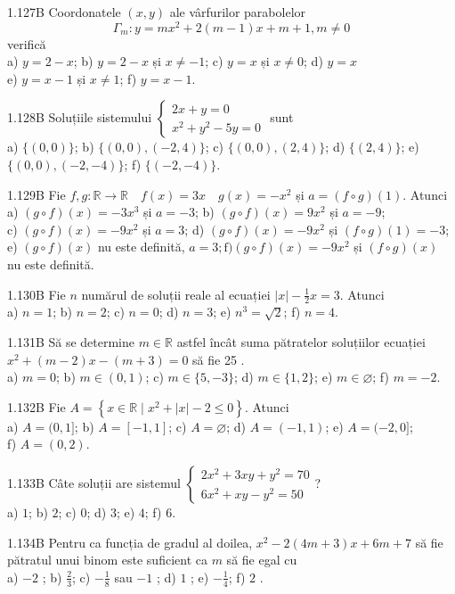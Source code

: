 \documentclass[11pt]{article}
\begin{document}
1.127B Coordonatele $(x, y)$ ale vârfurilor parabolelor $$\Gamma_{m}: y=m x^{2}+2(m-1) x+m+1, m\neq 0$$ verifică\\ a) $y=2-x$; b) $y=2-x$ și $x \neq-1$; c) $y=x$ și $x \neq 0$; d) $y=x$\\ e) $y=x-1$ și $x \neq 1$; f) $y=x-1$.

1.128B Soluțiile sistemului $\left\{\begin{array}{l}2 x+y=0 \\ x^{2}+y^{2}-5 y=0\end{array}\right.$ sunt\\ a) $\{(0,0)\}$; b) $\{(0,0),(-2,4)\}$; c) $\{(0,0),(2,4)\}$; d) $\{(2,4)\}$; e) $\{(0,0),(-2,-4)\}$; f) $\{(-2,-4)\}$.

1.129B Fie $f, g: \mathbb{R} \rightarrow \mathbb{R} \quad f(x)=3 x \quad g(x)=-x^{2}$ și $a=(f \circ g)(1)$. Atunci\\ a) $(g \circ f)(x)=-3 x^{3}$ și $a=-3$; b) $(g \circ f)(x)=9 x^{2}$ și $a=-9$;\\ c) $(g \circ f)(x)=-9 x^{2}$ și $a=3$; d) $(g \circ f)(x)=-9 x^{2}$ și $(f \circ g)(1)=-3$;\\ e) $(g \circ f)(x)$ nu este definită, $a=3 ; \mathrm{f})(g \circ f)(x)=-9 x^{2}$ și $(f \circ g)(x)$ nu este definită.

1.130B Fie $n$ numărul de soluții reale al ecuației $|x|-\frac{1}{2} x=3$. Atunci\\
a) $n=1$; b) $n=2$; c) $n=0$; d) $n=3$; e) $n^{3}=\sqrt{2}$; f) $n=4$. 

1.131B Să se determine $m \in \mathbb{R}$ astfel încât suma pătratelor soluțiilor ecuației $x^{2}+(m-2) x-(m+3)=0$ să fie 25 .\\ a) $m=0$; b) $m \in(0,1)$; c) $m \in\{5,-3\}$; d) $m \in\{1,2\}$; e) $m \in \varnothing$; f) $m=-2$.

1.132B Fie $A=\left\{x \in \mathbb{R} \mid x^{2}+\left|x\right|-2 \leq 0\right\}$. Atunci\\ a) $A=(0,1]$; b) $A=[-1,1]$; c) $A=\varnothing$; d) $A=(-1,1)$; e) $A=(-2,0]$;\\ f) $A=(0,2)$.

1.133B Câte soluții are sistemul $\left\{\begin{array}{l}2 x^{2}+3 x y+y^{2}=70 \\ 6 x^{2}+x y-y^{2}=50\end{array}\right.$?\\ a) $1$; b) $2$; c) $0$; d) $3$; e) $4$; f) $6$. 

1.134B Pentru ca funcția de gradul al doilea, $x^{2}-2(4 m+3) x+6 m+7$ să fie pătratul unui binom este suficient ca $m$ să fie egal cu\\ a) $-2$ ; b) $\frac{2}{3}$; c) $-\frac{1}{8}$ sau $-1$ ; d) $1$ ; e) $-\frac{1}{4}$; f) $2$ .
\end{document}
